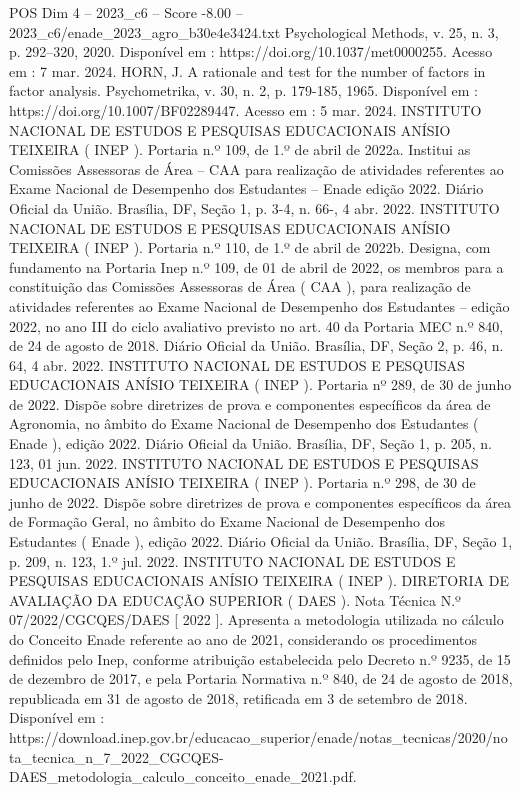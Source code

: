 \begin{textsample}{POS Dim 4 – 2023\_c6 – Score -8.00 – 2023\_c6/enade\_2023\_agro\_b30e4e3424.txt}
Psychological Methods, v. 25, n. 3, p. 292–320, 2020.
Disponível em : https://doi.org/10.1037/met0000255.
Acesso em : 7 mar. 2024.
HORN, J.
A rationale and test for the number of factors in factor analysis.
Psychometrika, v. 30, n. 2, p. 179-185, 1965.
Disponível em : https://doi.org/10.1007/BF02289447.
Acesso em : 5 mar. 2024.
INSTITUTO NACIONAL DE ESTUDOS E PESQUISAS EDUCACIONAIS ANÍSIO TEIXEIRA ( INEP ).
Portaria n.º 109, de 1.º de abril de 2022a.
Institui as Comissões Assessoras de Área – CAA para realização de atividades referentes ao Exame Nacional de Desempenho dos Estudantes – Enade edição 2022.
Diário Oficial da União.
Brasília, DF, Seção 1, p. 3-4, n. 66-, 4 abr. 2022.
INSTITUTO NACIONAL DE ESTUDOS E PESQUISAS EDUCACIONAIS ANÍSIO TEIXEIRA ( INEP ).
Portaria n.º 110, de 1.º de abril de 2022b.
Designa, com fundamento na Portaria Inep n.º 109, de 01 de abril de 2022, os membros para a constituição das Comissões Assessoras de Área ( CAA ), para realização de atividades referentes ao Exame Nacional de Desempenho dos Estudantes – edição 2022, no ano III do ciclo avaliativo previsto no art. 40 da Portaria MEC n.º 840, de 24 de agosto de 2018.
Diário Oficial da União.
Brasília, DF, Seção 2, p. 46, n. 64, 4 abr. 2022.
INSTITUTO NACIONAL DE ESTUDOS E PESQUISAS EDUCACIONAIS ANÍSIO TEIXEIRA ( INEP ).
Portaria nº 289, de 30 de junho de 2022.
Dispõe sobre diretrizes de prova e componentes específicos da área de Agronomia, no âmbito do Exame Nacional de Desempenho dos Estudantes ( Enade ), edição 2022.
Diário Oficial da União.
Brasília, DF, Seção 1, p. 205, n. 123, 01 jun. 2022.
INSTITUTO NACIONAL DE ESTUDOS E PESQUISAS EDUCACIONAIS ANÍSIO TEIXEIRA ( INEP ).
Portaria n.º 298, de 30 de junho de 2022.
Dispõe sobre diretrizes de prova e componentes específicos da área de Formação Geral, no âmbito do Exame Nacional de Desempenho dos Estudantes ( Enade ), edição 2022.
Diário Oficial da União.
Brasília, DF, Seção 1, p. 209, n. 123, 1.º jul. 2022.
INSTITUTO NACIONAL DE ESTUDOS E PESQUISAS EDUCACIONAIS ANÍSIO TEIXEIRA ( INEP ).
DIRETORIA DE AVALIAÇÃO DA EDUCAÇÃO SUPERIOR ( DAES ).
Nota Técnica N.º 07/2022/CGCQES/DAES [ 2022 ].
Apresenta a metodologia utilizada no cálculo do Conceito Enade referente ao ano de 2021, considerando os procedimentos definidos pelo Inep, conforme atribuição estabelecida pelo Decreto n.º 9235, de 15 de dezembro de 2017, e pela Portaria Normativa n.º 840, de 24 de agosto de 2018, republicada em 31 de agosto de 2018, retificada em 3 de setembro de 2018.
Disponível em : https://download.inep.gov.br/educacao\_superior/enade/notas\_tecnicas/2020/nota\_tecnica\_n\_7\_2022\_CGCQES-DAES\_metodologia\_calculo\_conceito\_enade\_2021.pdf.

\end{textsample}
